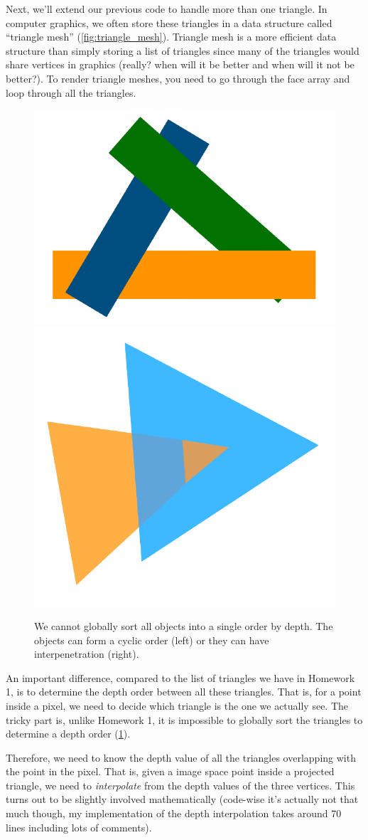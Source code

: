 Next, we'll extend our previous code to handle more than one triangle. In computer graphics, we often store these triangles in a data structure called ``triangle mesh'' (\cref{fig:triangle_mesh}). Triangle mesh is a more efficient data structure than simply storing a list of triangles since many of the triangles would share vertices in graphics (really? when will it be better and when will it not be better?). To render triangle meshes, you need to go through the face array and loop through all the triangles. 

\begin{figure}[h]
    \centering
    \includegraphics[width=0.4\linewidth]{imgs/cyclic.pdf}
    \includegraphics[width=0.4\linewidth]{imgs/interpenetration.pdf}
    \caption{We cannot globally sort all objects into a single order by depth. The objects can form a cyclic order (left) or they can have interpenetration (right).}
    \label{fig:depth_order}
\end{figure}

An important difference, compared to the list of triangles we have in Homework 1, is to determine the depth order between all these triangles. That is, for a point inside a pixel, we need to decide which triangle is the one we actually see. The tricky part is, unlike Homework 1, it is impossible to globally sort the triangles to determine a depth order (\cref{fig:depth_order}).

Therefore, we need to know the depth value of all the triangles overlapping with the point in the pixel. That is, given a image space point inside a projected triangle, we need to \emph{interpolate} from the depth values of the three vertices. This turns out to be slightly involved mathematically (code-wise it's actually not that much though, my implementation of the depth interpolation takes around 70 lines including lots of comments). 

